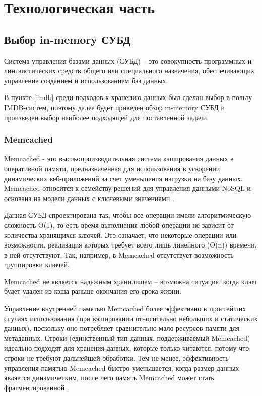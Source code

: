 \chapter{Технологическая часть}



\section{Выбор in-memory СУБД}


Система управления базами данных (СУБД) -- это совокупность программных и лингвистических средств общего или специального назначения, обеспечивающих управление созданием и использованием баз данных\cite{database}.

В пункте \ref{imdb} среди подходов к хранению данных был сделан выбор в пользу IMDB-систем, поэтому далее будет приведен обзор in-memory СУБД и произведен выбор наиболее подходящей для поставленной задачи.




\subsection{Memcached}

Memcached - это высокопроизводительная система кэширования данных в оперативной памяти, предназначенная для использования в ускорении динамических веб-приложений за счет уменьшения нагрузки на базу данных. Memcached относится к семейству решений для управления данными NoSQL и основана на модели данных с ключевыми значениями  \cite{memcash}. 

Данная СУБД спроектирована так, чтобы все операции имели алгоритмическую сложность O(1), то есть время выполнения любой операции не зависит от количества хранящихся ключей. Это означает, что некоторые операции или возможности, реализация которых требует всего лишь линейного (O(n)) времени, в ней отсутствуют. Так, например, в Memcached отсутствует возможность группировки ключей.


Memcached не является надежным хранилищем – возможна ситуация, когда ключ будет удален из кэша раньше окончания его срока жизни. 

Управление внутренней памятью Memcached более эффективно в простейших случаях использования (при кэшировании относительно небольших и статических данных), поскольку оно потребляет сравнительно мало ресурсов памяти для метаданных. Строки (единственный тип данных, поддерживаемый Memcached) идеально подходят для хранения данных, которые только читаются, потому что строки не требуют дальнейшей обработки. Тем не менее, эффективность управления памятью Memcached быстро уменьшается, когда размер данных является динамическим, после чего память Memcached может стать фрагментированной \cite{memcash2}. 

